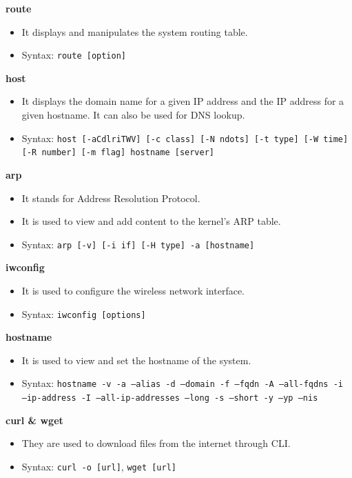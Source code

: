 \documentclass{article}
\begin{document}
\noindent\textbf{route}
\begin{itemize}
    \item It displays and manipulates the system routing table.
    \item Syntax: \texttt{route [option]}
\end{itemize}

\noindent\textbf{host}
\begin{itemize}
    \item It displays the domain name for a given IP address and the IP address for a given hostname. It can also be used for DNS lookup.
    \item Syntax: \texttt{host [-aCdlriTWV] [-c class] [-N ndots] [-t type] [-W time] [-R number] [-m flag] hostname [server]}
\end{itemize}

\noindent\textbf{arp}
\begin{itemize}
    \item It stands for Address Resolution Protocol.
    \item It is used to view and add content to the kernel's ARP table.
    \item Syntax: \texttt{arp [-v] [-i if] [-H type] -a [hostname]}
\end{itemize}

\noindent\textbf{iwconfig}
\begin{itemize}
    \item It is used to configure the wireless network interface.
    \item Syntax: \texttt{iwconfig [options]}
\end{itemize}

\noindent\textbf{hostname}
\begin{itemize}
    \item It is used to view and set the hostname of the system.
    \item Syntax: \texttt{hostname -v -a --alias -d --domain -f --fqdn -A --all-fqdns -i --ip-address -I --all-ip-addresses --long -s --short -y --yp --nis}
\end{itemize}

\noindent\textbf{curl \& wget}
\begin{itemize}
    \item They are used to download files from the internet through CLI.
    \item Syntax: \texttt{curl -o [url]}, \texttt{wget [url]}
\end{itemize}
\end{document}
